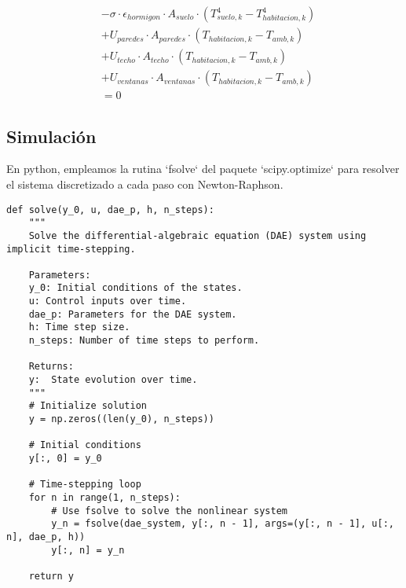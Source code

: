 \begin{align}
	                                                                                            & - \sigma \cdot \epsilon_{hormigon} \cdot A_{suelo} \cdot (T_{suelo,k}^4 - T_{habitacion,k}^4) \nonumber \\
	                                                                                            & + U_{paredes} \cdot A_{paredes} \cdot (T_{habitacion,k} - T_{amb,k}) \nonumber                          \\
	                                                                                            & + U_{techo} \cdot A_{techo} \cdot (T_{habitacion,k} - T_{amb,k}) \nonumber                              \\
	                                                                                            & + U_{ventanas} \cdot A_{ventanas} \cdot (T_{habitacion,k} - T_{amb,k}) \nonumber                        \\
	                                                                                            & = 0
\end{align}


\subsection{Simulación}


En python, empleamos la rutina `fsolve` del paquete `scipy.optimize` para
resolver el sistema discretizado a cada paso con Newton-Raphson.

\begin{verbatim}
def solve(y_0, u, dae_p, h, n_steps):
    """
    Solve the differential-algebraic equation (DAE) system using implicit time-stepping.

    Parameters:
    y_0: Initial conditions of the states.
    u: Control inputs over time.
    dae_p: Parameters for the DAE system.
    h: Time step size.
    n_steps: Number of time steps to perform.

    Returns:
    y:  State evolution over time.
    """
    # Initialize solution
    y = np.zeros((len(y_0), n_steps))

    # Initial conditions
    y[:, 0] = y_0

    # Time-stepping loop
    for n in range(1, n_steps):
        # Use fsolve to solve the nonlinear system
        y_n = fsolve(dae_system, y[:, n - 1], args=(y[:, n - 1], u[:, n], dae_p, h))
        y[:, n] = y_n

    return y
\end{verbatim}

